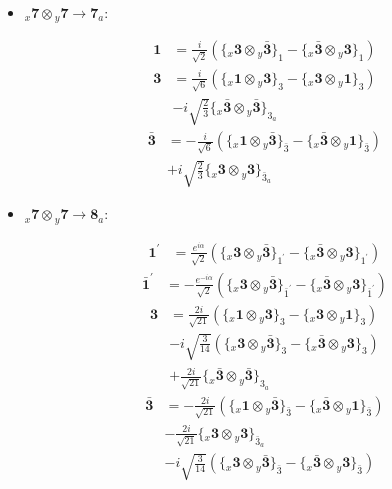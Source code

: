 \documentclass[english]{article}
\newcommand{\rep}[1]{\mathbf{#1}}
\newcommand{\repx}[2]{{}_{#2}\mathbf{#1}}
\newcommand{\tsprodx}[2]{\repx{#1}{x}\otimes\repx{#2}{y}}
\newcommand{\subcgt}[3]{\big\{ \tsprodx{#1}{#2}\big\}^{}_{#3}}
\begin{document}
\begin{itemize}
\begin{fleqn}
\begin{align*}
\end{align*}
\end{fleqn}
\item $\tsprodx{7}{7}\to\rep{7}_{a}$:
\begin{fleqn}
\begin{align*}
\rep{1} & = \frac{i}{\sqrt{2}}\left(\subcgt{3}{\bar{3}}{1}-\subcgt{\bar{3}}{3}{1}\right)
\end{align*}
\begin{align*}
\rep{3} & = \frac{i}{\sqrt{6}}\left(\subcgt{1}{3}{3}-\subcgt{3}{1}{3}\right) \\ 
 & -i \sqrt{\frac{2}{3}}\subcgt{\bar{3}}{\bar{3}}{3_{a}}
\end{align*}
\begin{align*}
\rep{\bar{3}} & = -\frac{i}{\sqrt{6}}\left(\subcgt{1}{\bar{3}}{\bar{3}}-\subcgt{\bar{3}}{1}{\bar{3}}\right) \\ 
 & +i \sqrt{\frac{2}{3}}\subcgt{3}{3}{\bar{3}_{a}}
\end{align*}
\end{fleqn}
\item $\tsprodx{7}{7}\to\rep{8}_{a}$:
\begin{fleqn}
\begin{align*}
\rep{1^{\prime}} & = \frac{e^{i \alpha }}{\sqrt{2}}\left(\subcgt{3}{\bar{3}}{1^{\prime}}-\subcgt{\bar{3}}{3}{1^{\prime}}\right)
\end{align*}
\begin{align*}
\rep{\bar{1}^{\prime}} & = -\frac{e^{-i \alpha }}{\sqrt{2}}\left(\subcgt{3}{\bar{3}}{\bar{1}^{\prime}}-\subcgt{\bar{3}}{3}{\bar{1}^{\prime}}\right)
\end{align*}
\begin{align*}
\rep{3} & = \frac{2 i}{\sqrt{21}}\left(\subcgt{1}{3}{3}-\subcgt{3}{1}{3}\right) \\ 
 & -i \sqrt{\frac{3}{14}}\left(\subcgt{3}{\bar{3}}{3}-\subcgt{\bar{3}}{3}{3}\right) \\ 
 & +\frac{2 i}{\sqrt{21}}\subcgt{\bar{3}}{\bar{3}}{3_{a}}
\end{align*}
\begin{align*}
\rep{\bar{3}} & = -\frac{2 i}{\sqrt{21}}\left(\subcgt{1}{\bar{3}}{\bar{3}}-\subcgt{\bar{3}}{1}{\bar{3}}\right) \\ 
 & -\frac{2 i}{\sqrt{21}}\subcgt{3}{3}{\bar{3}_{a}} \\ 
 & -i \sqrt{\frac{3}{14}}\left(\subcgt{3}{\bar{3}}{\bar{3}}-\subcgt{\bar{3}}{3}{\bar{3}}\right)
\end{align*}
\end{fleqn}
\end{itemize}
\end{document}
